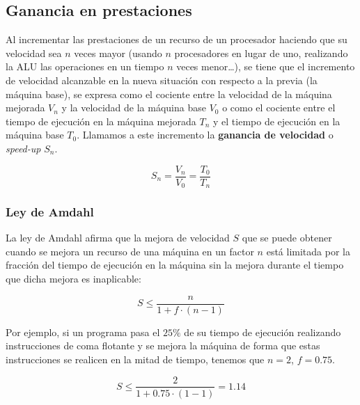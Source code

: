 \subsection{Ganancia en prestaciones}\label{ganancia-prestaciones}

Al incrementar las prestaciones de un recurso de un procesador haciendo que su velocidad sea $n$ veces mayor (usando $n$ procesadores en lugar de uno, realizando la ALU las operaciones en un tiempo $n$ veces menor\ldots), se tiene que el incremento de velocidad alcanzable en la nueva situación con respecto a la previa (la máquina base), se expresa como el cociente entre la velocidad de la máquina mejorada $V_n$ y la velocidad de la máquina base $V_0$ o como el cociente entre el tiempo de ejecución en la máquina mejorada $T_n$ y el tiempo de ejecución en la máquina base $T_0$.
Llamamos a este incremento la \textbf{ganancia de velocidad} o \textit{speed-up} $S_n$.

\[S_n=\frac{V_n}{V_0}=\frac{T_0}{T_n}\]

\subsubsection{Ley de Amdahl}

La ley de Amdahl afirma que la mejora de velocidad $S$ que se puede obtener cuando se mejora un recurso de una máquina en un factor $n$ está limitada por la fracción del tiempo de ejecución en la máquina sin la mejora durante el tiempo que dicha mejora es inaplicable:

\[S\leq\frac{n}{1+f\cdot(n-1)}\]

Por ejemplo, si un programa pasa el $25\%$ de su tiempo de ejecución realizando instrucciones de coma flotante y se mejora la máquina de forma que estas instrucciones se realicen en la mitad de tiempo, tenemos que $n=2$, $f=0.75$.

\[S\leq\frac{2}{1+0.75\cdot(1-1)}=1.14\]
